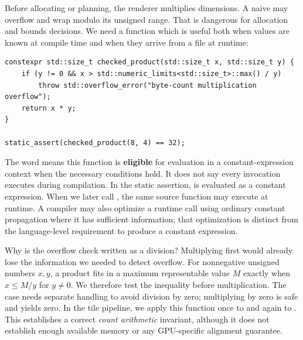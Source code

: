 \hypertarget{05-engine-i-ch005-some-calculations-can-be-used-at-compile-time-without-being-forced-there}{}

Before allocating or planning, the renderer multiplies dimensions. A naive  may overflow  and wrap modulo its unsigned range. That is dangerous for allocation and bounds decisions. We need a function which is useful both when values are known at compile time and when they arrive from a file at runtime:

\begin{verbatim}
constexpr std::size_t checked_product(std::size_t x, std::size_t y) {
    if (y != 0 && x > std::numeric_limits<std::size_t>::max() / y)
        throw std::overflow_error("byte-count multiplication overflow");
    return x * y;
}

static_assert(checked_product(8, 4) == 32);
\end{verbatim}

The word  means this function is \textbf{eligible} for evaluation in a constant-expression context when the necessary conditions hold. It does not say every invocation executes during compilation. In the static assertion,  is evaluated as a constant expression. When we later call , the same source function may execute at runtime. A compiler may also optimize a runtime call using ordinary constant propagation where it has sufficient information; that optimization is distinct from the language-level requirement to produce a constant expression.

Why is the overflow check written as a division? Multiplying first would already lose the information we needed to detect overflow. For nonnegative unsigned numbers \(x,y\), a product fits in a maximum representable value \(M\) exactly when \(x\le M/y\) for \(y\ne0\). We therefore test the inequality before multiplication. The  case needs separate handling to avoid division by zero; multiplying by zero is safe and yields zero. In the tile pipeline, we apply this function once to  and again to . This establishes a correct \emph{count arithmetic} invariant, although it does not establish enough available memory or any GPU-specific alignment guarantee.

